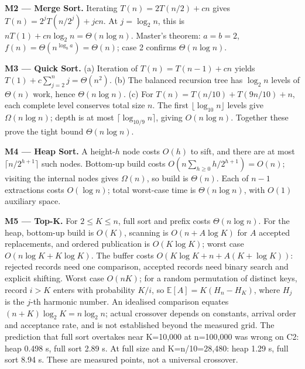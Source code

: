 \documentclass[10pt,a4paper]{article}
\begin{document}
\textbf{M2 --- Merge Sort.} Iterating
    \(T(n)=2T(n/2)+cn\) gives
    \(T(n)=2^jT(n/2^j)+jcn\).
    At \(j=\log_2n\), this is \(nT(1)+cn\log_2n=\Theta(n\log n)\).
    Master's theorem: \(a=b=2\), \(f(n)=\Theta(n^{\log_ba})=\Theta(n)\);
    case 2 confirms \(\Theta(n\log n)\).\par

\textbf{M3 --- Quick Sort.} (a) Iteration of
    \(T(n)=T(n-1)+cn\) yields
    \(T(1)+c\sum_{j=2}^{n}j=\Theta(n^2)\).
    (b) The balanced recursion tree has \(\log_2n\) levels of
    \(\Theta(n)\) work, hence \(\Theta(n\log n)\).
    (c) For \(T(n)=T(n/10)+T(9n/10)+n\), each complete level conserves
    total size \(n\). The first \(\lfloor\log_{10}n\rfloor\) levels give
    \(\Omega(n\log n)\); depth is at most
    \(\lceil\log_{10/9}n\rceil\), giving \(O(n\log n)\).
    Together these prove the tight bound \(\Theta(n\log n)\).\par

\textbf{M4 --- Heap Sort.} A height-\(h\) node costs \(O(h)\)
    to sift, and there are at most \(\lceil n/2^{h+1}\rceil\) such nodes.
    Bottom-up build costs
    \(O(n\sum_{h\geq0}h/2^{h+1})=O(n)\); visiting the internal nodes gives
    \(\Omega(n)\), so build is \(\Theta(n)\).
    Each of \(n-1\) extractions costs \(O(\log n)\);
    total worst-case time is \(\Theta(n\log n)\), with \(O(1)\) auxiliary space.\par

\textbf{M5 --- Top-K.}
                    For \(2\leq K\leq n\), full sort and prefix costs \(\Theta(n\log n)\).
                    For the heap, bottom-up build is \(O(K)\), scanning is
                    \(O(n+A\log K)\) for \(A\) accepted replacements, and
                    ordered publication is \(O(K\log K)\); worst case
                    \(O(n\log K+K\log K)\).
                    The buffer costs \(O(K\log K+n+A(K+\log K))\):
                    rejected records need one comparison, accepted records need
                    binary search and explicit shifting. Worst case \(O(nK)\);
                    for a random permutation of distinct keys, record \(i>K\)
                    enters with probability \(K/i\), so \(\mathbb E[A]=K(H_n-H_K)\),
                    where \(H_j\) is the \(j\)-th harmonic number.
                    An idealised comparison equates
                    \((n+K)\log_2K=n\log_2n\); actual crossover depends on
                    constants, arrival order and acceptance rate, and is not
                    established beyond the measured grid. The prediction that full sort overtakes near K=10,000 at n=100,000 was wrong on C2: heap 0.498 s, full sort 2.89 s. At full size and K=n/10=28,480: heap 1.29 s, full sort 8.94 s. These are measured points, not a universal crossover.\par
\end{document}
